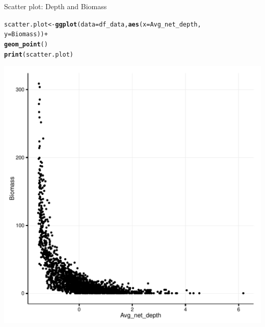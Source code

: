 \documentclass{beamer}\usepackage[]{graphicx}\usepackage[]{color}
\makeatletter
\def\maxwidth{ %
  \ifdim\Gin@nat@width>\linewidth
    \linewidth
  \else
    \Gin@nat@width
  \fi
}
\newcommand{\hlopt}[1]{\textcolor[rgb]{0,0,0}{#1}}%
\newcommand{\hlstd}[1]{\textcolor[rgb]{0.345,0.345,0.345}{#1}}%
\newcommand{\hlkwb}[1]{\textcolor[rgb]{0.69,0.353,0.396}{#1}}%
\newcommand{\hlkwc}[1]{\textcolor[rgb]{0.333,0.667,0.333}{#1}}%
\newcommand{\hlkwd}[1]{\textcolor[rgb]{0.737,0.353,0.396}{\textbf{#1}}}%
\newenvironment{kframe}{%
 \def\at@end@of@kframe{}%
 \ifinner\ifhmode%
  \def\at@end@of@kframe{\end{minipage}}%
  \begin{minipage}{\columnwidth}%
 \fi\fi%
 \def\FrameCommand##1{\hskip\@totalleftmargin \hskip-\fboxsep
 \colorbox{shadecolor}{##1}\hskip-\fboxsep
     \hskip-\linewidth \hskip-\@totalleftmargin \hskip\columnwidth}%
 \MakeFramed {\advance\hsize-\width
   \@totalleftmargin\z@ \linewidth\hsize
   \@setminipage}}%
 {\par\unskip\endMakeFramed%
 \at@end@of@kframe}
\newenvironment{knitrout}{}{} %
\makeatother
\begin{document}
\begin{frame}[fragile]{Scatter plot: Depth and Biomass}
\begin{knitrout}
\color{fgcolor}\begin{kframe}
\begin{alltt}
  \hlstd{scatter.plot} \hlkwb{<-} \hlkwd{ggplot}\hlstd{(}\hlkwc{data}\hlstd{=df_data,} \hlkwd{aes}\hlstd{(}\hlkwc{x}\hlstd{=Avg_net_depth,}
                                           \hlkwc{y}\hlstd{=Biomass))} \hlopt{+}
                \hlkwd{geom_point}\hlstd{()}
  \hlkwd{print}\hlstd{(scatter.plot)}
\end{alltt}
\end{kframe}
\includegraphics[width=\maxwidth]{boring-plot-1} 

\end{knitrout}
       
\end{frame}
\end{document}
